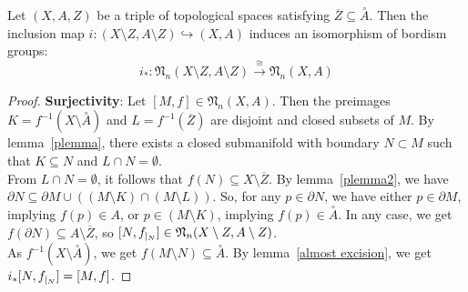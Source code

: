 \documentclass[a4paper,11pt]{article}
\begin{document}
\begin{lemma}\label{excision}
    Let \((X,A,Z)\) be a triple of topological spaces satisfying \(\overline{Z}\subseteq\overset{\circ}{A}\). Then the inclusion map \(i:(X\setminus Z,A\setminus Z)\hookrightarrow(X,A)\) induces an isomorphism of bordism groups:
    \[i_\ast:\mathfrak{N}_n(X\setminus Z,A\setminus Z)\xrightarrow{\cong}\mathfrak{N}_n(X,A)\]
\end{lemma}

\begin{proof}\cite{zhang}
    \textbf{Surjectivity}: Let \([M,f]\in\mathfrak{N}_n(X,A)\). Then the preimages \(K=f^{-1}(X\setminus\overset{\circ}A)\) and \(L=f^{-1}(\overline{Z})\) are disjoint and closed subsets of \(M\). By lemma\ \ref{plemma}, there exists a closed submanifold with boundary \(N\subset M\) such that \(K\subseteq N\) and \(L\cap N=\emptyset\).\\
    From \(L\cap N=\emptyset\), it follows that \(f(N)\subseteq X\setminus\overline{Z}\). By lemma\ \ref{plemma2}, we have \(\partial N\subseteq \partial M\cup((M\setminus K)\cap(M\setminus L))\). So, for any \(p\in \partial N\), we have either \(p\in\partial M\), implying \(f(p)\in A\), or \(p\in(M\setminus K)\), implying \(f(p)\in\overset{\circ}A\). In any case, we get \(f(\partial N)\subseteq A\setminus\overline{Z}\), so \([N, f_{|_{N}}]\in\mathfrak{N}_n(X\setminus Z,A\setminus Z)\).\\
    As \(f^{-1}(X\setminus\overset{\circ}A)\), we get \(f(M\setminus N)\subseteq \overset{\circ}A\). By lemma\ \ref{almost excision}, we get \(i_\ast[N,f_{|_{N}}]=[M,f]\).


\end{proof}
\end{document}
